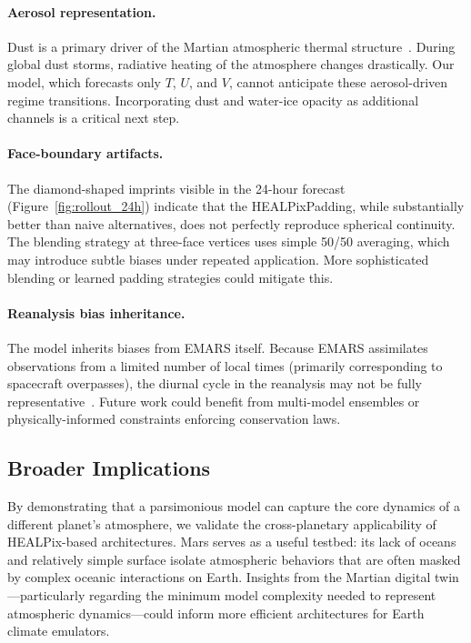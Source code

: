 \documentclass[11pt, a4paper, twocolumn]{article}
\begin{document}
\paragraph{Aerosol representation.} Dust is a primary driver of the Martian atmospheric thermal structure~\cite{montabone2015eight,kahre2017}. During global dust storms, radiative heating of the atmosphere changes drastically. Our model, which forecasts only $T$, $U$, and $V$, cannot anticipate these aerosol-driven regime transitions. Incorporating dust and water-ice opacity as additional channels is a critical next step.

\paragraph{Face-boundary artifacts.} The diamond-shaped imprints visible in the 24-hour forecast (Figure~\ref{fig:rollout_24h}) indicate that the HEALPixPadding, while substantially better than naive alternatives, does not perfectly reproduce spherical continuity. The blending strategy at three-face vertices uses simple 50/50 averaging, which may introduce subtle biases under repeated application. More sophisticated blending or learned padding strategies could mitigate this.

\paragraph{Reanalysis bias inheritance.} The model inherits biases from EMARS itself. Because EMARS assimilates observations from a limited number of local times (primarily corresponding to spacecraft overpasses), the diurnal cycle in the reanalysis may not be fully representative~\cite{greybush2019}. Future work could benefit from multi-model ensembles or physically-informed constraints enforcing conservation laws.

\subsection{Broader Implications}

By demonstrating that a parsimonious model can capture the core dynamics of a different planet's atmosphere, we validate the cross-planetary applicability of HEALPix-based architectures. Mars serves as a useful testbed: its lack of oceans and relatively simple surface isolate atmospheric behaviors that are often masked by complex oceanic interactions on Earth. Insights from the Martian digital twin---particularly regarding the minimum model complexity needed to represent atmospheric dynamics---could inform more efficient architectures for Earth climate emulators.
\end{document}
